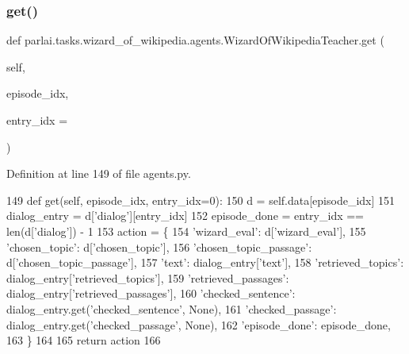 \subsubsection{\texorpdfstring{get()}{get()}}
{\footnotesize\ttfamily def parlai.\+tasks.\+wizard\+\_\+of\+\_\+wikipedia.\+agents.\+Wizard\+Of\+Wikipedia\+Teacher.\+get (\begin{DoxyParamCaption}\item[{}]{self,  }\item[{}]{episode\+\_\+idx,  }\item[{}]{entry\+\_\+idx = {} }\end{DoxyParamCaption})}



Definition at line 149 of file agents.\+py.


\begin{DoxyCode}
149     \textcolor{keyword}{def }get(self, episode\_idx, entry\_idx=0):
150         d = self.data[episode\_idx]
151         dialog\_entry = d[\textcolor{stringliteral}{'dialog'}][entry\_idx]
152         episode\_done = entry\_idx == len(d[\textcolor{stringliteral}{'dialog'}]) - 1
153         action = \{
154             \textcolor{stringliteral}{'wizard\_eval'}: d[\textcolor{stringliteral}{'wizard\_eval'}],
155             \textcolor{stringliteral}{'chosen\_topic'}: d[\textcolor{stringliteral}{'chosen\_topic'}],
156             \textcolor{stringliteral}{'chosen\_topic\_passage'}: d[\textcolor{stringliteral}{'chosen\_topic\_passage'}],
157             \textcolor{stringliteral}{'text'}: dialog\_entry[\textcolor{stringliteral}{'text'}],
158             \textcolor{stringliteral}{'retrieved\_topics'}: dialog\_entry[\textcolor{stringliteral}{'retrieved\_topics'}],
159             \textcolor{stringliteral}{'retrieved\_passages'}: dialog\_entry[\textcolor{stringliteral}{'retrieved\_passages'}],
160             \textcolor{stringliteral}{'checked\_sentence'}: dialog\_entry.get(\textcolor{stringliteral}{'checked\_sentence'}, \textcolor{keywordtype}{None}),
161             \textcolor{stringliteral}{'checked\_passage'}: dialog\_entry.get(\textcolor{stringliteral}{'checked\_passage'}, \textcolor{keywordtype}{None}),
162             \textcolor{stringliteral}{'episode\_done'}: episode\_done,
163         \}
164 
165         \textcolor{keywordflow}{return} action
166 
\end{DoxyCode}
\mbox{\label{classparlai_1_1tasks_1_1wizard__of__wikipedia_1_1agents_1_1WizardOfWikipediaTeacher_aaf24cfe4f6e58a7d9d8bda076759f76d}} 
